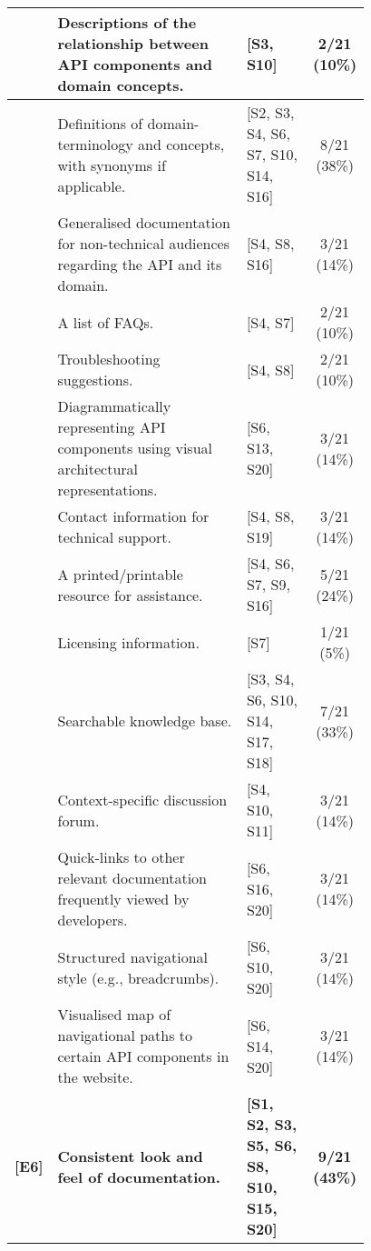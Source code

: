 \begin{table*}[hbt]
\begin{tabular}{|rp{0.58\linewidth}||p{0.2\linewidth}|c|}
    \hline
    \hline
    [C1]&
    Descriptions of the relationship between API components and domain concepts.
    &
    [S3, S10] &
    2/21 (10\%)\\

    \hline
    [C2]&
    Definitions of domain-terminology and concepts, with synonyms if applicable.
    &
    [S2, S3, S4, S6, S7, S10, S14, S16] &
    8/21 (38\%)\\

    \hline
    [C3]&
    Generalised documentation for non-technical audiences regarding the API and its domain.
    &
    [S4, S8, S16] &
    3/21 (14\%)\\

    \hline
    \hline
    [D1]&
    A list of FAQs.
    &
    [S4, S7] &
    2/21 (10\%)\\

    \hline
    [D2]&
    Troubleshooting suggestions.
    &
    [S4, S8] &
    2/21 (10\%)\\

    \hline
    [D3]&
    Diagrammatically representing API components using visual architectural representations.
    &
    [S6, S13, S20] &
    3/21 (14\%)\\

    \hline
    [D4]&
    Contact information for technical support.
    &
    [S4, S8, S19] &
    3/21 (14\%)\\

    \hline
    [D5]&
    A printed/printable resource for assistance.
    &
    [S4, S6, S7, S9, S16] &
    5/21 (24\%)\\

    \hline
    [D6]&
    Licensing information.
    &
    [S7] &
    1/21 (5\%)\\

    \hline
    \hline
    [E1]&
    Searchable knowledge base.
    &
    [S3, S4, S6, S10, S14, S17, S18] &
    7/21 (33\%)\\

    \hline
    [E2]&
    Context-specific discussion forum.
    &
    [S4, S10, S11] &
    3/21 (14\%)\\

    \hline
    [E3]&
    Quick-links to other relevant documentation frequently viewed by developers.
    &
    [S6, S16, S20] &
    3/21 (14\%)\\

    \hline
    [E4]&
    Structured navigational style (e.g., breadcrumbs).
    &
    [S6, S10, S20] &
    3/21 (14\%)\\

    \hline
    [E5]&
    Visualised map of navigational paths to certain API components in the website.
    &
    [S6, S14, S20] &
    3/21 (14\%)\\

    \hline
    \textbf{[E6]}&
    \textbf{Consistent look and feel of documentation.}
    &
    \textbf{[S1, S2, S3, S5, S6, S8, S10, S15, S20]} &
    \textbf{9/21 (43\%)}\\
    \hline
  \end{tabular}
\end{table*}